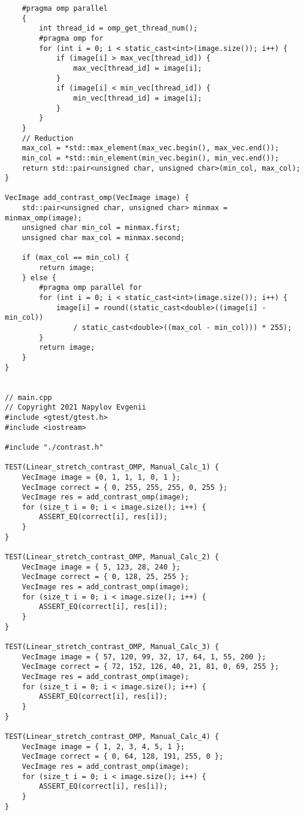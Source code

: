 \documentclass{report}
\begin{document}
\begin{lstlisting}
    #pragma omp parallel
    {
        int thread_id = omp_get_thread_num();
        #pragma omp for
        for (int i = 0; i < static_cast<int>(image.size()); i++) {
            if (image[i] > max_vec[thread_id]) {
                max_vec[thread_id] = image[i];
            }
            if (image[i] < min_vec[thread_id]) {
                min_vec[thread_id] = image[i];
            }
        }
    }
    // Reduction
    max_col = *std::max_element(max_vec.begin(), max_vec.end());
    min_col = *std::min_element(min_vec.begin(), min_vec.end());
    return std::pair<unsigned char, unsigned char>(min_col, max_col);
}

VecImage add_contrast_omp(VecImage image) {
    std::pair<unsigned char, unsigned char> minmax = minmax_omp(image);
    unsigned char min_col = minmax.first;
    unsigned char max_col = minmax.second;

    if (max_col == min_col) {
        return image;
    } else {
        #pragma omp parallel for
        for (int i = 0; i < static_cast<int>(image.size()); i++) {
            image[i] = round((static_cast<double>((image[i] - min_col))
                / static_cast<double>((max_col - min_col))) * 255);
        }
        return image;
    }
}


// main.cpp
// Copyright 2021 Napylov Evgenii
#include <gtest/gtest.h>
#include <iostream>

#include "./contrast.h"

TEST(Linear_stretch_contrast_OMP, Manual_Calc_1) {
    VecImage image = {0, 1, 1, 1, 0, 1 };
    VecImage correct = { 0, 255, 255, 255, 0, 255 };
    VecImage res = add_contrast_omp(image);
    for (size_t i = 0; i < image.size(); i++) {
        ASSERT_EQ(correct[i], res[i]);
    }
}

TEST(Linear_stretch_contrast_OMP, Manual_Calc_2) {
    VecImage image = { 5, 123, 28, 240 };
    VecImage correct = { 0, 128, 25, 255 };
    VecImage res = add_contrast_omp(image);
    for (size_t i = 0; i < image.size(); i++) {
        ASSERT_EQ(correct[i], res[i]);
    }
}

TEST(Linear_stretch_contrast_OMP, Manual_Calc_3) {
    VecImage image = { 57, 120, 99, 32, 17, 64, 1, 55, 200 };
    VecImage correct = { 72, 152, 126, 40, 21, 81, 0, 69, 255 };
    VecImage res = add_contrast_omp(image);
    for (size_t i = 0; i < image.size(); i++) {
        ASSERT_EQ(correct[i], res[i]);
    }
}

TEST(Linear_stretch_contrast_OMP, Manual_Calc_4) {
    VecImage image = { 1, 2, 3, 4, 5, 1 };
    VecImage correct = { 0, 64, 128, 191, 255, 0 };
    VecImage res = add_contrast_omp(image);
    for (size_t i = 0; i < image.size(); i++) {
        ASSERT_EQ(correct[i], res[i]);
    }
}


\end{lstlisting}
\end{document}
